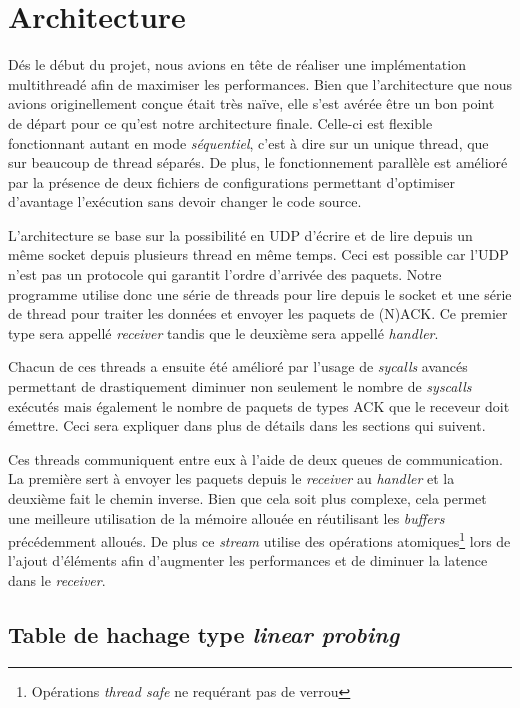 \documentclass[../main.tex]{subfiles}
\begin{document}
\section{Architecture}
\label{sec:architecture}

Dés le début du projet, nous avions en tête de réaliser une implémentation multithreadé afin de maximiser les performances. Bien que l'architecture que nous
avions originellement conçue était très naïve, elle s'est avérée être un bon point de départ pour ce qu'est notre architecture finale. Celle-ci est flexible
fonctionnant autant en mode \textit{séquentiel}, c'est à dire sur un unique thread, que sur beaucoup de thread séparés. De plus, le fonctionnement parallèle
est amélioré par la présence de deux fichiers de configurations permettant d'optimiser d'avantage l'exécution sans devoir changer le code source.

L'architecture se base sur la possibilité en UDP d'écrire et de lire depuis un même socket depuis plusieurs thread en même temps. Ceci est possible car l'UDP
n'est pas un protocole qui garantit l'ordre d'arrivée des paquets. Notre programme utilise donc une série de threads pour lire depuis le socket et une série
de thread pour traiter les données et envoyer les paquets de (N)ACK. Ce premier type sera appellé \textit{receiver} tandis que le deuxième sera appellé \textit{handler}.

Chacun de ces threads a ensuite été amélioré par l'usage de \textit{sycalls} avancés permettant de drastiquement diminuer non seulement le nombre de \textit{syscalls}
exécutés mais également le nombre de paquets de types ACK que le receveur doit émettre. Ceci sera expliquer dans plus de détails dans les sections
qui suivent.

Ces threads communiquent entre eux à l'aide de deux queues de communication. La première sert à envoyer les paquets depuis le \textit{receiver} au \textit{handler}
et la deuxième fait le chemin inverse. Bien que cela soit plus complexe, cela permet une meilleure utilisation de la mémoire allouée en réutilisant les
\textit{buffers} précédemment alloués. De plus ce \textit{stream} utilise des opérations atomiques\footnote{ Opérations \textit{thread safe} ne requérant pas de verrou}
lors de l'ajout d'éléments afin d'augmenter les performances et de diminuer la latence dans le \textit{receiver}.

\subsection{Table de hachage type \textit{linear probing}}
\label{sec:hash_table}
\end{document}
